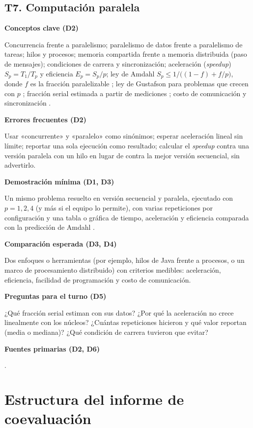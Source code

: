 \documentclass[11pt,a4paper]{article}
\newcommand{\campo}[1]{\par\smallskip\textbf{\color{uteqBlue}#1}\par}
\begin{document}
\subsection{T7. Computación paralela}
\begin{fichaBox}[title={Ficha T7 --- Computación paralela}]
	\campo{Conceptos clave (D2)}
	Concurrencia frente a paralelismo; paralelismo de datos frente a paralelismo de tareas; hilos y procesos; memoria compartida frente a memoria distribuida (paso de mensajes); condiciones de carrera y sincronización; aceleración (\emph{speedup}) $S_p = T_1/T_p$ y eficiencia $E_p = S_p/p$; ley de Amdahl $S_p \leq 1/\bigl((1-f) + f/p\bigr)$, donde $f$ es la fracción paralelizable \cite{amdahl1967validity}; ley de Gustafson para problemas que crecen con $p$ \cite{gustafson1988reevaluating}; fracción serial estimada a partir de mediciones \cite{karp1990measuring}; costo de comunicación y sincronización \cite{hill2008amdahl}.
	\campo{Errores frecuentes (D2)}
	Usar «concurrente» y «paralelo» como sinónimos; esperar aceleración lineal sin límite; reportar una sola ejecución como resultado; calcular el \emph{speedup} contra una versión paralela con un hilo en lugar de contra la mejor versión secuencial, sin advertirlo.
	\campo{Demostración mínima (D1, D3)}
	Un mismo problema resuelto en versión secuencial y paralela, ejecutado con $p = 1, 2, 4$ (y más si el equipo lo permite), con varias repeticiones por configuración y una tabla o gráfica de tiempo, aceleración y eficiencia comparada con la predicción de Amdahl \cite{hoefler2015scientific}.
	\campo{Comparación esperada (D3, D4)}
	Dos enfoques o herramientas (por ejemplo, hilos de Java frente a procesos, o un marco de procesamiento distribuido) con criterios medibles: aceleración, eficiencia, facilidad de programación y costo de comunicación.
	\campo{Preguntas para el turno (D5)}
	¿Qué fracción serial estiman con sus datos? ¿Por qué la aceleración no crece linealmente con los núcleos? ¿Cuántas repeticiones hicieron y qué valor reportan (media o mediana)? ¿Qué condición de carrera tuvieron que evitar?
	\campo{Fuentes primarias (D2, D6)}
	\cite{amdahl1967validity,gustafson1988reevaluating,karp1990measuring,hill2008amdahl,hoefler2015scientific,kleppmann2026designing}.
\end{fichaBox}

\section{Estructura del informe de coevaluación}\label{sec:estructura}
\end{document}
